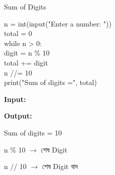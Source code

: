 \begin{codeoutputbox}{Sum of Digits}

\noindent
\begin{minipage}[t]{0.53\linewidth}
\codeheading

\begin{english}
\ttfamily
n = int(input("Enter a number: "))\\
total = 0\\[0.5mm]
while n > 0:\\
\hspace*{4mm}digit = n \% 10\\
\hspace*{4mm}total += digit\\
\hspace*{4mm}n //= 10\\[0.5mm]
print("Sum of digits =", total)
\end{english}

\end{minipage}
\hfill
\begin{minipage}[t]{0.43\linewidth}
\outputheading

\textbf{Input:}
\textenglish{}

\medskip

\textbf{Output:}

\textenglish{\ttfamily Sum of digits = 10}

\medskip

\textenglish{\ttfamily n \% 10}
\(\rightarrow\)
শেষ Digit

\medskip

\textenglish{\ttfamily n // 10}
\(\rightarrow\)
শেষ Digit বাদ

\end{minipage}

\end{codeoutputbox}



